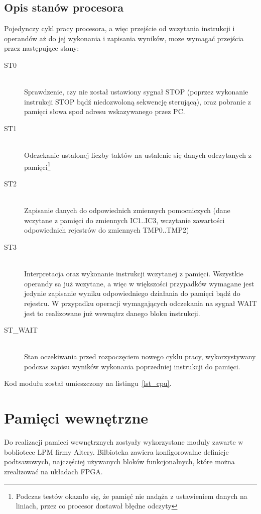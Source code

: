 \documentclass[a4paper,12pt]{report}
\begin{document}
\subsection{Opis stanów procesora}
Pojedynczy cykl pracy procesora, a więc przejście od wczytania instrukcji i operandów aż do jej wykonania i zapisania wyników, moze wymagać przejścia przez następujące stany:
\begin{description}
\item[ST0] \hfill \\
Sprawdzenie, czy nie został ustawiony sygnał STOP (poprzez wykonanie instrukcji STOP bądź niedozwoloną sekwencję sterującą), oraz pobranie z pamięci słowa spod adresu wskazywanego przez PC.
\item[ST1] \hfill \\
Odczekanie ustalonej liczby taktów na ustalenie się danych odczytanych z pamięci\footnote{Podczas testów okazało się, że pamięć nie nadąża z ustawieniem danych na liniach, przez co procesor dostawał błędne odczyty}
\item[ST2] \hfill \\
Zapisanie danych do odpowiednich zmiennych pomocniczych (dane wczytane z pamięci do zmiennych IC1..IC3, wczytanie zawartości odpowiednich rejestrów do zmiennych TMP0..TMP2)
\item[ST3] \hfill \\
Interpretacja oraz wykonanie instrukcji wczytanej z pamięci. Wszystkie operandy sa już wczytane, a więc w większości przypadków wymagane jest jedynie zapisanie wyniku odpowiedniego działania do pamięci bądź do rejestru. W przypadku operacji wymagających odczekania na sygnał WAIT jest to realizowane już wewnątrz danego bloku instrukcji.
\item[ST\_WAIT] \hfill \\
Stan oczekiwania przed rozpoczęciem nowego cyklu pracy, wykorzystywany podczas zapisu wyników wykonania poprzedniej instrukcji do pamięci.
\end{description}

Kod modułu został umieszczony na listingu~\ref{lst_cpu}.

\section{Pamięci wewnętrzne}
Do realizacji pamieci wewnętrznych zostyały wykorzystane moduly zawarte w  bobliotece LPM firmy Altery. Bilbioteka zawiera konfigorowalne definicje podtsawowych, najczęściej używanych bloków funkcjonalnych, które można zrealizować na układach FPGA.
\end{document}
